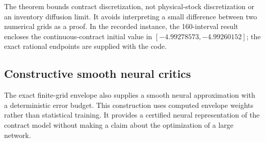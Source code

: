 The theorem bounds contract discretization, not physical-stock discretization or an inventory diffusion limit. It avoids interpreting a small difference between two numerical grids as a proof. In the recorded instance, the 160-interval result encloses the continuous-contract initial value in $[-4.99278573,-4.99260152]$; the exact rational endpoints are supplied with the code.

\subsection{Constructive smooth neural critics}
The exact finite-grid envelope also supplies a smooth neural approximation with a deterministic error budget. This construction uses computed envelope weights rather than statistical training. It provides a certified neural representation of the contract model without making a claim about the optimization of a large network.


